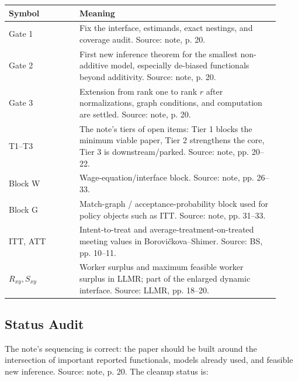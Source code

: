 \documentclass[11pt]{article}
\begin{document}
\begin{center}
\begin{tabular}{>{\raggedright\arraybackslash}p{0.24\linewidth}
                >{\raggedright\arraybackslash}p{0.68\linewidth}}
\toprule
Symbol & Meaning \\
\midrule
Gate 1 & Fix the interface, estimands, exact nestings, and coverage audit. Source: note, p. 20. \\
Gate 2 & First new inference theorem for the smallest non-additive model, especially de-biased functionals beyond additivity. Source: note, p. 20. \\
Gate 3 & Extension from rank one to rank $r$ after normalizations, graph conditions, and computation are settled. Source: note, p. 20. \\
T1--T3 & The note's tiers of open items: Tier 1 blocks the minimum viable paper, Tier 2 strengthens the core, Tier 3 is downstream/parked. Source: note, pp. 20--22. \\
Block W & Wage-equation/interface block. Source: note, pp. 26--33. \\
Block G & Match-graph / acceptance-probability block used for policy objects such as ITT. Source: note, pp. 31--33. \\
ITT, ATT & Intent-to-treat and average-treatment-on-treated meeting values in Borovi\v{c}kova--Shimer. Source: BS, pp. 10--11. \\
$R_{xy},S_{xy}$ & Worker surplus and maximum feasible worker surplus in LLMR; part of the enlarged dynamic interface. Source: LLMR, pp. 18--20. \\
\bottomrule
\end{tabular}
\end{center}

\subsection{Status Audit}

The note's sequencing is correct: the paper should be built around the intersection of
important reported functionals, models already used, and feasible new inference. Source:
note, p. 20. The cleanup status is:
\end{document}
